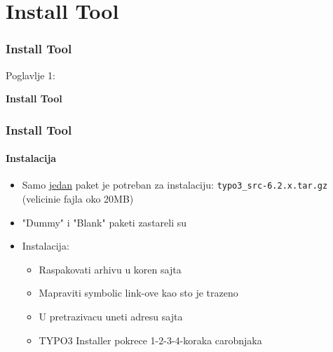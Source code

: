 %

\section{Install Tool}
\begin{frame}[fragile]
	\frametitle{Install Tool}

	\begin{center}\huge{Poglavlje 1:}\end{center}
	\begin{center}\huge{\color{typo3darkgrey}\textbf{Install Tool}}\end{center}

\end{frame}


\begin{frame}[fragile]
	\frametitle{Install Tool}
	\framesubtitle{Instalacija}

	\begin{itemize}
		\item Samo \underline{jedan} paket je potreban za instalaciju:\newline
				\texttt{typo3\_src-6.2.x.tar.gz} (velicinie fajla oko 20MB)
		\item "Dummy" i  "Blank" paketi zastareli su
		\item Instalacija:
			\begin{itemize}
				\item Raspakovati arhivu u koren sajta
				\item Mapraviti symbolic link-ove kao sto je trazeno
				\item U pretrazivacu uneti adresu sajta
				\item TYPO3 Installer pokrece 1-2-3-4-koraka carobnjaka
			\end{itemize}

	\end{itemize}

\end{frame}

